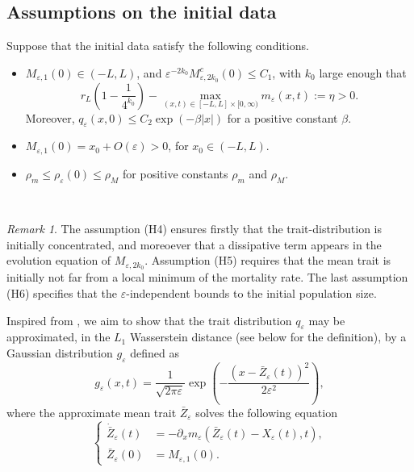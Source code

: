 \documentclass[]{article}
\theoremstyle{remark}
\newtheorem{remark}{Remark}
\begin{document}
\subsection*{Assumptions on the initial data} 
Suppose that the initial data satisfy the following conditions.
\ \\
\begin{itemize}
    \item[(H4)] $M_{\varepsilon,1}(0)\in(-L,L)$, and $\varepsilon^{-2k_0}M^{c}_{\varepsilon,2k_0}(0)\leq{}C_1$, with $k_0$ large enough that \[r_L\left(1-\frac{1}{4^{k_0}}\right)-\max_{(x,t)\in[-L,L]\times[0,\infty)}m_\varepsilon(x,t):=\eta>0.\]
Moreover, $q_{\varepsilon}(x,0)\leq{}C_2\exp(-\beta|x|)$ for a positive constant $\beta$.

    \item[(H5)] $M_{\varepsilon,1}(0)=x_0+O(\varepsilon)>0$, for $x_0\in(-L,L)$.
    \item[(H6)] $\rho_m\leq{}\rho_\varepsilon(0)\leq{}\rho_M$ for positive constants $\rho_m$ and $\rho_M$. 
    \end{itemize}
\ \\    
    \begin{remark}
   The assumption (H4) ensures firstly that the trait-distribution is initially concentrated, and moreoever that a dissipative term appears in the evolution equation of $M_{\varepsilon,2k_0}$. Assumption (H5) requires that the mean trait is initially not far from a local minimum of the mortality rate. The last assumption (H6) specifies that the $\varepsilon$-independent bounds to the initial population size.
\end{remark}
Inspired from \cite{GHM}, we aim to show that the trait distribution $q_\varepsilon$ may be approximated, in the $L_1$ Wasserstein distance (see below for the definition), by a Gaussian distribution $g_\varepsilon$ defined as
\begin{equation}\label{eqn:approximate_distribution}
    g_\varepsilon(x,t)=\frac{1}{\sqrt{2\pi\varepsilon}}\exp\left(-\frac{(x-\bar{Z}_\varepsilon(t))^2}{2\varepsilon^2}\right),
\end{equation}
where  the approximate mean trait $\bar{Z}_\varepsilon$ solves the following equation
\begin{equation}
\label{eqn:approx_mean_trait}
\left\{
\begin{aligned}
\dot{\bar{Z}}_\varepsilon(t) &= -  \partial_{x}m_\varepsilon(\bar{Z}_\varepsilon(t)-X_\varepsilon(t),t), \\
\bar{Z}_\varepsilon(0) & = M_{\varepsilon,1}(0).  
\end{aligned}
\right.
\end{equation}
\end{document}
